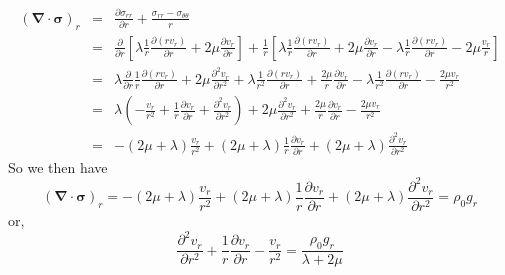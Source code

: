 \begin{eqnarray}
({\bm \nabla}\cdot {\bm \sigma})_r 
&=& 
\frac{\partial \sigma_{rr}}{\partial r} + \frac{\sigma_{rr}-\sigma_{\theta\theta}}{r} \\
&=& 
\frac{\partial }{\partial r} \left[
\lambda \frac{1}{r} \frac{\partial (r v_r)}{\partial r} + 2\mu\frac{\partial v_r}{\partial r} 
 \right] 
+ \frac{1}{r}
\left[
\lambda \frac{1}{r} \frac{\partial (r v_r)}{\partial r} + 2\mu\frac{\partial v_r}{\partial r} 
-
\lambda \frac{1}{r} \frac{\partial (r v_r)}{\partial r}  -  2 \mu\frac{v_r}{r} 
\right] \\
 &=& 
\lambda \frac{\partial }{\partial r}  \frac{1}{r} \frac{\partial (r v_r)}{\partial r} 
+ 2\mu\frac{\partial^2 v_r}{\partial r^2} 
+ 
\lambda \frac{1}{r^2} \frac{\partial (r v_r)}{\partial r} + \frac{2\mu}{r}\frac{\partial v_r}{\partial r} 
- \lambda \frac{1}{r^2} \frac{\partial (r v_r)}{\partial r}  - \frac{2 \mu v_r}{r^2} \\
&=&
\lambda ( -\frac{v_r}{r^2} + \frac{1}{r} \frac{\partial v_r}{\partial r} + \frac{\partial^2 v_r}{\partial r^2} )
+ 2\mu\frac{\partial^2 v_r}{\partial r^2} 
+ \frac{2\mu}{r}\frac{\partial v_r}{\partial r}
- \frac{2 \mu v_r}{r^2} \\ 
&=&
-(2\mu+\lambda)\frac{v_r}{r^2} 
+(2\mu+\lambda)\frac{1}{r}\frac{\partial v_r}{\partial r}  
+(2\mu+\lambda)\frac{\partial^2 v_r}{\partial r^2}  
\end{eqnarray}
So we then have 
\[
({\bm \nabla}\cdot {\bm \sigma})_r
= 
-(2\mu+\lambda)\frac{v_r}{r^2} 
+(2\mu+\lambda)\frac{1}{r}\frac{\partial v_r}{\partial r}  
+(2\mu+\lambda)\frac{\partial^2 v_r}{\partial r^2} 
=\rho_0 g_r 
\]
or, 
\[
\boxed{
\frac{\partial^2 v_r}{\partial r^2} 
+\frac{1}{r}\frac{\partial v_r}{\partial r}  
-\frac{v_r}{r^2} 
=\frac{\rho_0 g_r}{\lambda+2\mu}
}
\]


